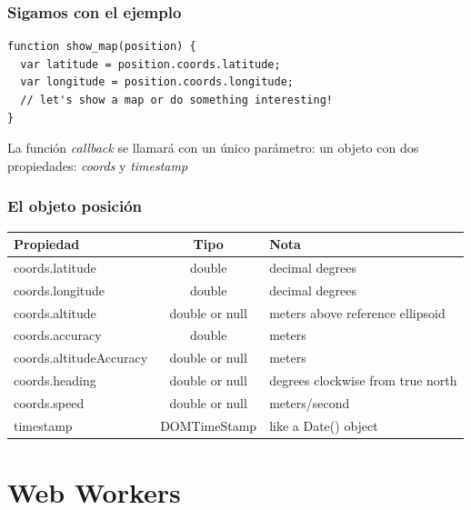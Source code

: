 
\begin{frame}[fragile]
\frametitle{Sigamos con el ejemplo}

\begin{verbatim}
function show_map(position) {
  var latitude = position.coords.latitude;
  var longitude = position.coords.longitude;
  // let's show a map or do something interesting!
}
\end{verbatim}

La función \emph{callback} se llamará con un único parámetro: un objeto con dos
propiedades: \emph{coords} y \emph{timestamp}

\end{frame}


\begin{frame}
\frametitle{El objeto posición}

\begin{footnotesize}
\begin{tabular}{ l c l }
Propiedad & Tipo & Nota \\
\hline
coords.latitude	& double	& decimal degrees \\
coords.longitude & double	& decimal degrees \\
coords.altitude	& double or null	& meters above reference ellipsoid \\
coords.accuracy	& double	& meters \\
coords.altitudeAccuracy	& double or null	& meters \\
coords.heading	& double or null	& degrees clockwise from true north \\
coords.speed	& double or null	& meters/second \\
timestamp	& DOMTimeStamp	& like a Date() object \\
\end{tabular}
\end{footnotesize}

\end{frame}



\section{Web Workers}

